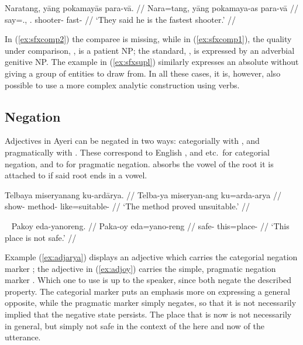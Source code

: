 
\a\label{ex:sfxsupl}\begingl
	\gla Naratang, yāng pokamayās para-vā. //
	\glb Nara=tang, yāng pokamaya-as para-vā //
	\glc say=\TplM{}.\Aarg{}, \TsgM.\Aarg{} shooter-\Parg{} fast-\Supl{} //
	\glft `They said he is the fastest shooter.' //
\endgl\xe

In (\ref{ex:sfxcomp2}) the comparee is missing, while in (\ref{ex:sfxcomp1}),
the quality under comparison, , is a patient NP; the standard, , is expressed
by an adverbial genitive NP. The example in (\ref{ex:sfxsupl}) similarly
expresses an absolute without giving a group of entities to draw from. In all
these cases, it is, however, also possible to use a more complex analytic
construction using verbs.


\subsection{Negation}
\label{subsec:adjneg}

Adjectives in Ayeri can be negated in two ways: categorially with 
, and pragmatically with . These correspond to
English , and  etc.\ for categorial negation, and to
 for pragmatic negation.  absorbs the vowel of the root 
it is attached to if said root ends in a vowel.

\ex\label{ex:adjarya}\begingl
	\gla Telbaya miseryanang ku-ardārya. //
	\glb Telba-ya miseryan-ang ku=arda-arya //
	\glc show-\TsgM{} method-\Aarg{} like=suitable-\Neg{} //
	\glft `The method proved unsuitable.' //
\endgl\xe

\ex~\label{ex:adjoy}\begingl
	\gla Pakoy eda-yanoreng. //
	\glb Paka-oy eda=yano-reng //
	\glc safe-\Neg{} this=place-\AargI{} //
	\glft `This place is not safe.' //
\endgl\xe

Example (\ref{ex:adjarya}) displays an adjective which carries the categorial
negation marker ; the adjective in (\ref{ex:adjoy}) carries
the simple, pragmatic negation marker . Which one to use is up
to the speaker, since both negate the described property. The categorial marker
puts an emphasis more on expressing a general opposite, while the pragmatic
marker simply negates, so that it is not necessarily implied that the negative
state persists. The place that is  now is not
necessarily  in general, but simply not safe in
the context of the here and now of the utterance.

